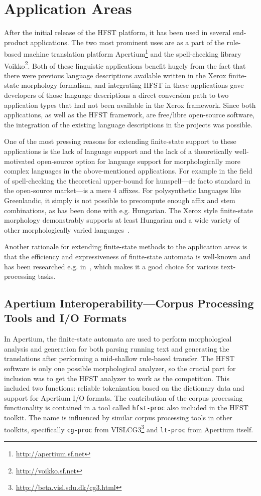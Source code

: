 \documentclass{llncs}
\begin{document}
\section{Application Areas}\label{hfst:application-areas}
After the initial release of the HFST platform, it has been used in several end-product
applications. The two most prominent uses are as a part of the rule-based
machine translation platform Apertium\footnote{\url{http://apertium.sf.net}}
and the spell-checking library Voikko\footnote{\url{http://voikko.sf.net}}. Both of
these linguistic applications benefit hugely from the fact that there
were previous language descriptions available written in the Xerox finite-state
morphology formalism, and integrating HFST in these applications gave
developers of those language descriptions a direct conversion path to two
application types that had not been available in the Xerox framework. Since
both applications, as well as the HFST framework, are free/libre open-source
software, the integration of the existing language descriptions in the
projects was possible.

One of the most pressing reasons for extending finite-state support to these
applications is the lack of language support and the lack of a theoretically well-motivated
open-source option for language support for morphologically more complex languages
in the above-mentioned applications. For example in the field of spell-checking the
theoretical upper-bound for hunspell---de facto standard in the open-source 
market---is a mere 4 affixes. For polysynthetic languages like Greenlandic, it simply is
not possible to precompute enough affix and stem combinations, as has been done with
e.g. Hungarian. The Xerox style finite-state morphology demonstrably supports
at least Hungarian and a wide variety of other morphologically varied
languages~\cite{beesley/2003}.

Another rationale for extending finite-state methods to the application areas
is that the efficiency and expressiveness of finite-state automata is
well-known and has been researched e.g. in~\cite{aho/2007}, which makes it a good choice
for various text-processing tasks.

\subsection{Apertium Interoperability---Corpus Processing Tools and I/O Formats}
In Apertium, the finite-state automata are used to perform morphological analysis and generation for
both parsing running text and generating the translations after performing
a mid-shallow rule-based transfer. The HFST software is only one possible morphological analyzer, 
so the crucial part for inclusion was to get the HFST analyzer to work as the competition. 
This included two functions: reliable tokenization based on
the dictionary data and support for Apertium I/O formats. The 
contribution of the corpus processing functionality is contained in a tool
called \texttt{hfst-proc} also included in the HFST toolkit. The name is influenced by
similar corpus processing tools in other toolkits, specifically
\texttt{cg-proc} from VISLCG3\footnote{\url{http://beta.visl.sdu.dk/cg3.html}} and
\texttt{lt-proc} from Apertium itself.
\end{document}
